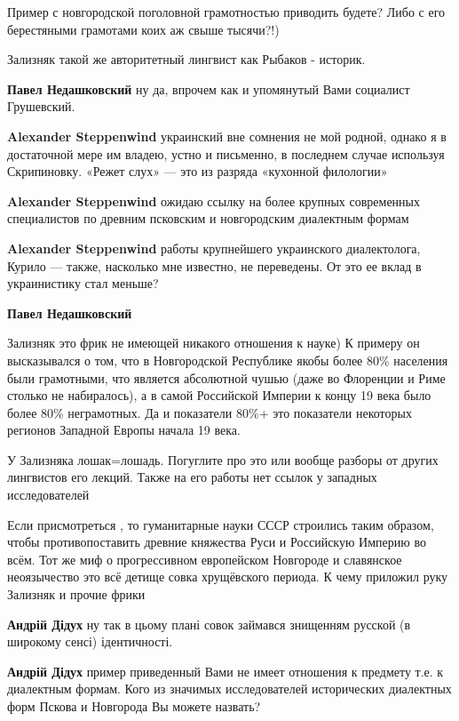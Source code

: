 \begin{itemize}
\begin{itemize}
Пример с новгородской поголовной грамотностью приводить будете? Либо с его
берестяными грамотами коих аж свыше тысячи?!)

Зализняк такой же авторитетный лингвист как Рыбаков - историк.

\textbf{Павел Недашковский} ну да, впрочем как и упомянутый Вами социалист Грушевский.

\textbf{Alexander Steppenwind} украинский вне сомнения не мой родной, однако я в достаточной мере им владею, устно и письменно, в последнем случае используя Скрипиновку. «Режет слух» — это из разряда «кухонной филологии»

\textbf{Alexander Steppenwind} ожидаю ссылку на более крупных современных специалистов по древним псковским и новгородским диалектным формам

\textbf{Alexander Steppenwind} работы крупнейшего украинского диалектолога, Курило — также, насколько мне известно, не переведены. От это ее вклад в украинистику стал меньше?

\textbf{Павел Недашковский} 

Зализняк это фрик не имеющей никакого отношения к науке) К примеру он
высказывался о том, что в Новгородской Республике якобы более 80\% населения
были грамотными, что является абсолютной чушью (даже во Флоренции и Риме
столько не набиралось), а в самой Российской Империи к концу 19 века было более
80\% неграмотных. Да и показатели 80\%+ это показатели некоторых регионов
Западной Европы начала 19 века.

У Зализняка лошак=лошадь. Погуглите про это или вообще разборы от других
лингвистов его лекций. Также на его работы нет ссылок у западных исследователей


Если присмотреться , то гуманитарные науки СССР строились таким образом, чтобы
противопоставить древние княжества Руси и Российскую Империю во всём. Тот же
миф о прогрессивном европейском Новгороде и славянское неоязычество это всё
детище совка хрущёвского периода. К чему приложил руку Зализняк и прочие фрики

\textbf{Андрій Дідух} ну так в цьому плані совок займався знищенням русской (в широкому сенсі) ідентичності.

\textbf{Андрій Дідух} пример приведенный Вами не имеет отношения к предмету т.е. к диалектным формам. Кого из значимых исследователей исторических диалектных форм Пскова и Новгорода Вы можете назвать?


\end{itemize}
\end{itemize}
